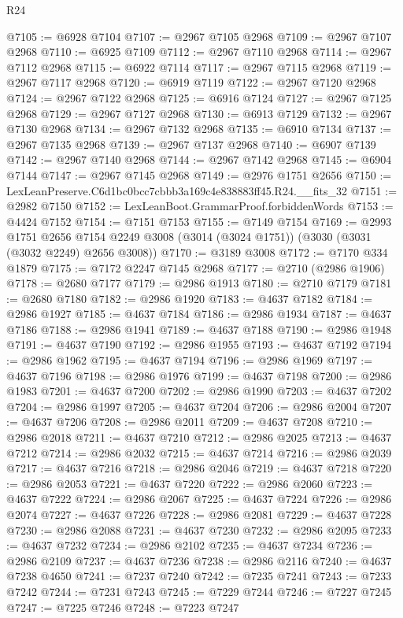 \begin{lexlean}{R24}
\begin{coremodule}
@7105 := @6928 @7104
@7107 := @2967 @7105 @2968
@7109 := @2967 @7107 @2968
@7110 := @6925 @7109
@7112 := @2967 @7110 @2968
@7114 := @2967 @7112 @2968
@7115 := @6922 @7114
@7117 := @2967 @7115 @2968
@7119 := @2967 @7117 @2968
@7120 := @6919 @7119
@7122 := @2967 @7120 @2968
@7124 := @2967 @7122 @2968
@7125 := @6916 @7124
@7127 := @2967 @7125 @2968
@7129 := @2967 @7127 @2968
@7130 := @6913 @7129
@7132 := @2967 @7130 @2968
@7134 := @2967 @7132 @2968
@7135 := @6910 @7134
@7137 := @2967 @7135 @2968
@7139 := @2967 @7137 @2968
@7140 := @6907 @7139
@7142 := @2967 @7140 @2968
@7144 := @2967 @7142 @2968
@7145 := @6904 @7144
@7147 := @2967 @7145 @2968
@7149 := @2976 @1751 @2656
@7150 := LexLeanPreserve.C6d1bc0bcc7cbbb3a169c4e838883ff45.R24.__fits_32
@7151 := @2982 @7150
@7152 := LexLeanBoot.GrammarProof.forbiddenWords
@7153 := @4424 @7152
@7154 := @7151 @7153
@7155 := @7149 @7154
@7169 := @2993
    @1751
    @2656
    @7154
    @2249
    @3008
    (@3014 (@3024 @1751))
    (@3030 (@3031 (@3032 @2249) @2656 @3008))
@7170 := @3189 @3008
@7172 := @7170 @334 @1879
@7175 := @7172 @2247 @7145 @2968
@7177 := @2710 (@2986 @1906)
@7178 := @2680 @7177
@7179 := @2986 @1913
@7180 := @2710 @7179
@7181 := @2680 @7180
@7182 := @2986 @1920
@7183 := @4637 @7182
@7184 := @2986 @1927
@7185 := @4637 @7184
@7186 := @2986 @1934
@7187 := @4637 @7186
@7188 := @2986 @1941
@7189 := @4637 @7188
@7190 := @2986 @1948
@7191 := @4637 @7190
@7192 := @2986 @1955
@7193 := @4637 @7192
@7194 := @2986 @1962
@7195 := @4637 @7194
@7196 := @2986 @1969
@7197 := @4637 @7196
@7198 := @2986 @1976
@7199 := @4637 @7198
@7200 := @2986 @1983
@7201 := @4637 @7200
@7202 := @2986 @1990
@7203 := @4637 @7202
@7204 := @2986 @1997
@7205 := @4637 @7204
@7206 := @2986 @2004
@7207 := @4637 @7206
@7208 := @2986 @2011
@7209 := @4637 @7208
@7210 := @2986 @2018
@7211 := @4637 @7210
@7212 := @2986 @2025
@7213 := @4637 @7212
@7214 := @2986 @2032
@7215 := @4637 @7214
@7216 := @2986 @2039
@7217 := @4637 @7216
@7218 := @2986 @2046
@7219 := @4637 @7218
@7220 := @2986 @2053
@7221 := @4637 @7220
@7222 := @2986 @2060
@7223 := @4637 @7222
@7224 := @2986 @2067
@7225 := @4637 @7224
@7226 := @2986 @2074
@7227 := @4637 @7226
@7228 := @2986 @2081
@7229 := @4637 @7228
@7230 := @2986 @2088
@7231 := @4637 @7230
@7232 := @2986 @2095
@7233 := @4637 @7232
@7234 := @2986 @2102
@7235 := @4637 @7234
@7236 := @2986 @2109
@7237 := @4637 @7236
@7238 := @2986 @2116
@7240 := @4637 @7238 @4650
@7241 := @7237 @7240
@7242 := @7235 @7241
@7243 := @7233 @7242
@7244 := @7231 @7243
@7245 := @7229 @7244
@7246 := @7227 @7245
@7247 := @7225 @7246
@7248 := @7223 @7247

\end{coremodule}
\end{lexlean}
